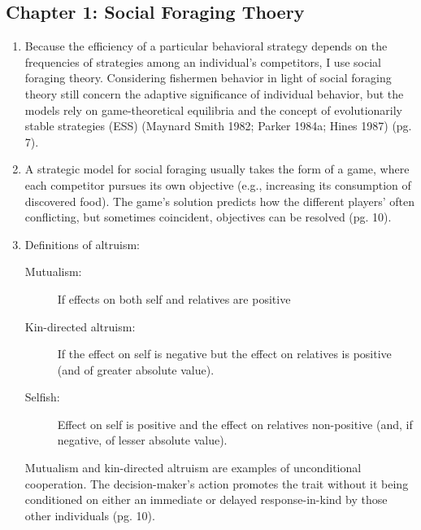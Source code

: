 \documentclass[a4paper,11pt]{article}
\begin{document}
\subsection*{Chapter 1: Social Foraging Thoery}
\begin{enumerate}
\item Because the efficiency of a particular behavioral strategy depends on the frequencies of strategies among an individual's competitors, I use social foraging theory.  Considering fishermen behavior in light of social foraging theory still concern the adaptive significance of individual behavior, but the models rely on game-theoretical equilibria and the concept of evolutionarily stable strategies (ESS) (Maynard Smith 1982; Parker 1984a; Hines 1987) (pg. 7).
\item A strategic model for social foraging usually takes the form of a game, where each competitor pursues its own objective (e.g., increasing its consumption of discovered food). The game's solution predicts how the different players' often conflicting, but sometimes coincident, objectives can be resolved (pg. 10). 
\item Definitions of altruism: 
\begin{description}
\item[Mutualism:] If effects on both self and relatives are positive
\item[Kin-directed altruism:] If the effect on self is negative but the effect on relatives is positive (and of greater absolute value). 
\item[Selfish:] Effect on self is positive and the effect on relatives non-positive (and, if negative, of lesser absolute value).
\end{description}
Mutualism and kin-directed altruism are examples of unconditional cooperation. The decision-maker's action promotes the trait without it being conditioned on either an immediate or delayed response-in-kind by those other individuals (pg. 10). 


\end{enumerate}
\end{document}
